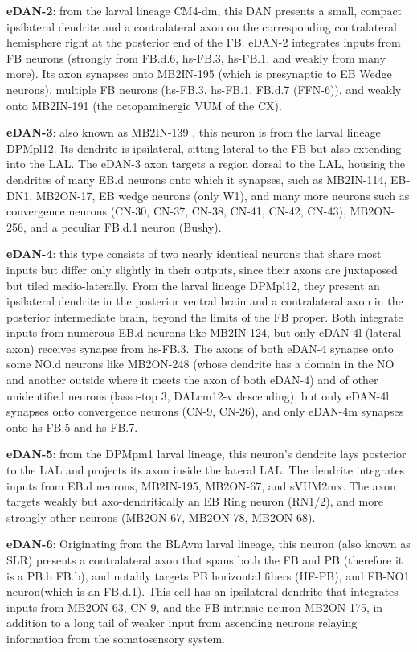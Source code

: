     \textbf{eDAN-2}: from the larval lineage CM4-dm, this DAN presents a small, compact ipsilateral dendrite and a contralateral axon on the corresponding contralateral hemisphere right at the posterior end of the FB. eDAN-2 integrates inputs from FB neurons (strongly from FB.d.6, hs-FB.3, hs-FB.1, and weakly from many more). Its axon synapses onto MB2IN-195 (which is presynaptic to EB Wedge neurons), multiple FB neurons (hs-FB.3, hs-FB.1, FB.d.7 (FFN-6)), and weakly onto MB2IN-191 (the octopaminergic VUM of the CX).

    \textbf{eDAN-3}: also known as MB2IN-139 \citep{eschbach2021circuits}, this neuron is from the larval lineage DPMpl12. Its dendrite is ipsilateral, sitting lateral to the FB but also extending into the LAL. The eDAN-3 axon targets a region dorsal to the LAL, housing the dendrites of  many EB.d neurons onto which it synapses, such as MB2IN-114, EB-DN1, MB2ON-17, EB wedge neurons (only W1), and many more neurons such as convergence neurons (CN-30, CN-37, CN-38, CN-41, CN-42, CN-43), MB2ON-256, and a peculiar FB.d.1 neuron (Bushy).

    \textbf{eDAN-4}: this type consists of two nearly identical neurons that share most inputs but differ only slightly in their outputs, since their axons are juxtaposed but tiled medio-laterally. From the larval lineage DPMpl12, they present an ipsilateral dendrite in the posterior ventral brain and a contralateral axon in the posterior intermediate brain, beyond the limits of the FB proper. Both integrate inputs from numerous EB.d neurons like MB2IN-124, but only eDAN-4l (lateral axon) receives synapse from hs-FB.3. The axons of both eDAN-4 synapse onto some NO.d neurons like MB2ON-248 (whose dendrite has a domain in the NO and another outside where it meets the axon of both eDAN-4) and of other unidentified neurons (lasso-top 3, DALcm12-v descending), but only eDAN-4l synapses onto convergence neurons (CN-9, CN-26), and only eDAN-4m synapses onto hs-FB.5 and hs-FB.7.

    \textbf{eDAN-5}: from the DPMpm1 larval lineage, this neuron's dendrite lays posterior to the LAL and projects its axon inside the lateral LAL. The dendrite integrates inputs from EB.d neurons, MB2IN-195, MB2ON-67, and sVUM2mx. The axon targets weakly but axo-dendritically an EB Ring neuron (RN1/2), and more strongly other neurons (MB2ON-67, MB2ON-78, MB2ON-68).


    \textbf{eDAN-6}: Originating from the BLAvm larval lineage, this neuron (also known as SLR) presents a contralateral axon that spans both the FB and PB (therefore it is a PB.b FB.b), and notably targets PB horizontal fibers (HF-PB), and FB-NO1 neuron(which is an FB.d.1). This cell has an ipsilateral dendrite that integrates inputs from MB2ON-63, CN-9, and the FB intrinsic neuron MB2ON-175, in addition to a long tail of weaker input from ascending neurons relaying information from the somatosensory system. 


